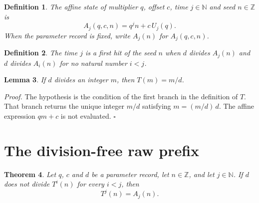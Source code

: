 \documentclass[11pt,letterpaper]{article}
\newcommand{\N}{\mathbb{N}}
\newcommand{\Z}{\mathbb{Z}}
\newtheorem{theorem}{Theorem}
\newtheorem{lemma}[theorem]{Lemma}
\newtheorem{definition}[theorem]{Definition}
\newenvironment{proof}{\noindent\textit{Proof.}}{\hfill\(\square\)}
\begin{document}
\begin{definition}\label{Def:AffineState}
The affine state of multiplier \(q\), offset \(c\), time \(j\in\N\) and seed \(n\in\Z\) is
\[
A_{j}(q,c,n)=q^{j}n+c\,U_{j}(q).
\]
When the parameter record is fixed, write \(A_{j}(n)\) for \(A_{j}(q,c,n)\).
\end{definition}

\begin{definition}\label{Def:FirstHit}
The time \(j\) is a first hit of the seed \(n\) when \(d\) divides \(A_{j}(n)\) and \(d\) divides \(A_{i}(n)\) for no natural number \(i<j\).
\end{definition}

\begin{lemma}\label{Lem:RawStepDivide}
If \(d\) divides an integer \(m\), then \(T(m)=m/d\).
\end{lemma}

\begin{proof}
The hypothesis is the condition of the first branch in the definition of \(T\). That branch returns the unique integer \(m/d\) satisfying \(m=(m/d)\,d\). The affine expression \(qm+c\) is not evaluated.
\end{proof}

\section{The division-free raw prefix}

\begin{theorem}\label{Thm:PrefixAffine}
Let \(q\), \(c\) and \(d\) be a parameter record, let \(n\in\Z\), and let \(j\in\N\). If \(d\) does not divide \(T^{i}(n)\) for every \(i<j\), then
\[
T^{j}(n)=A_{j}(n).
\]
\end{theorem}
\end{document}
